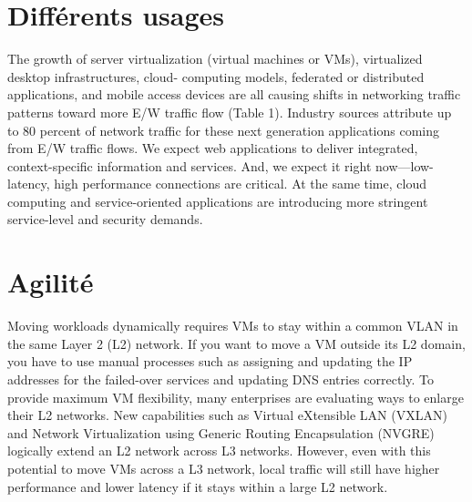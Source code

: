 





\section{Différents usages}

The growth of server virtualization (virtual machines or VMs), virtualized desktop infrastructures, cloud- computing models, federated or distributed applications, and mobile access devices are all causing shifts in networking traffic patterns toward more E/W traffic flow (Table 1). Industry sources attribute up to 80 percent of network traffic for these next generation applications coming from E/W traffic flows.
We expect web applications to deliver integrated, context-specific information and services. And, we expect it right now—low-latency, high performance connections are critical. At the same time, cloud computing and service-oriented applications are introducing more stringent service-level and security demands.

\section{Agilité}

Moving workloads dynamically requires VMs to stay within a common VLAN in the same Layer 2 (L2) network. If you want to move a VM outside its L2 domain, you have to use manual processes such as assigning and updating the IP addresses for the failed-over services and updating DNS entries correctly. To provide maximum VM flexibility, many enterprises are evaluating ways to enlarge their L2 networks.
New capabilities such as Virtual eXtensible LAN (VXLAN) and Network Virtualization using Generic Routing Encapsulation (NVGRE) logically extend an L2 network across L3 networks. However, even with this potential to move VMs across a L3 network, local traffic will still have higher performance and lower latency if it stays within a large L2 network.

